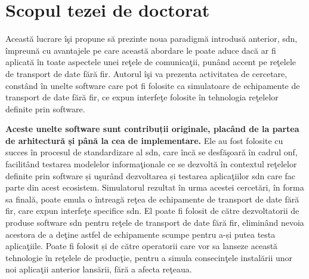 \section{Scopul tezei de doctorat}

Această lucrare îşi propune să prezinte noua paradigmă introdusă anterior, \gls{sdn}, împreună cu avantajele pe care această abordare le poate aduce dacă ar fi aplicată în toate aspectele unei reţele de comunicaţii, punând accent pe reţelele de transport de date fără fir. Autorul îşi va prezenta activitatea de cercetare, constând în unelte software care pot fi folosite ca simulatoare de echipamente de transport de date fără fir, ce expun interfeţe folosite în tehnologia reţelelor definite prin software.

\textbf{Aceste unelte software sunt contribuții originale, placând de la partea de arhitectură și până la cea de implementare.} Ele au fost folosite cu succes în procesul de standardizare al \gls{sdn}, care încă se desfăşoară în cadrul \gls{onf}, facilitând testarea modelelor informaţionale ce se dezvoltă în contextul reţelelor definite prin software și uşurând dezvoltarea și testarea aplicaţiilor \gls{sdn} care fac parte din acest ecosistem. Simulatorul rezultat în urma acestei cercetări, în forma sa finală, poate emula o întreagă reţea de echipamente de transport de date fără fir, care expun interfeţe specifice \gls{sdn}. El poate fi folosit de către dezvoltatorii de produse software \gls{sdn} pentru reţele de transport de date fără fir, eliminând nevoia acestora de a deţine astfel de echipamente scumpe pentru a-și putea testa aplicaţiile. Poate fi folosit și de către operatorii care vor sa lanseze această tehnologie în reţelele de producţie, pentru a simula consecinţele instalării unor noi aplicaţii anterior lansării, fără a afecta reţeaua.